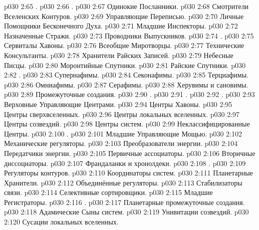 \vs p030 2:65 .
\vs p030 2:66 .
\vs p030 2:67 Одинокие Посланники.
\vs p030 2:68 Смотрители Вселенских Контуров.
\vs p030 2:69 Управляющие Переписью.
\vs p030 2:70 Личные Помощники Бесконечного Духа.
\vs p030 2:71 Младшие Инспекторы.
\vs p030 2:72 Назначенные Стражи.
\vs p030 2:73 Проводники Выпускников.
\vs p030 2:74 .
\vs p030 2:75 Сервиталы Хавоны.
\vs p030 2:76 Всеобщие Миротворцы.
\vs p030 2:77 Технические Консультанты.
\vs p030 2:78 Хранители Райских Записей.
\vs p030 2:79 Небесные Писцы.
\vs p030 2:80 Моронтийные Спутники.
\vs p030 2:81 Райские Спутники.
\vs p030 2:82 .
\vs p030 2:83 Супернафимы.
\vs p030 2:84 Секонафимы.
\vs p030 2:85 Терциафимы.
\vs p030 2:86 Омниафимы.
\vs p030 2:87 Серафимы.
\vs p030 2:88 Херувимы и сановимы.
\vs p030 2:89 Промежуточные создания.
\vs p030 2:90 .
\vs p030 2:91 .
\vs p030 2:92 .
\vs p030 2:93 Верховные Управляющие Центрами.
\vs p030 2:94 Центры Хавоны.
\vs p030 2:95 Центры сверхвселенных.
\vs p030 2:96 Центры локальных вселенных.
\vs p030 2:97 Центры созвездий.
\vs p030 2:98 Центры систем.
\vs p030 2:99 Неклассифицированные Центры.
\vs p030 2:100 .
\vs p030 2:101 Младшие Управляющие Мощью.
\vs p030 2:102 Механические регуляторы.
\vs p030 2:103 Преобразователи энергии.
\vs p030 2:104 Передатчики энергии.
\vs p030 2:105 Первичные ассоциаторы.
\vs p030 2:106 Вторичные диссоциаторы.
\vs p030 2:107 Франдаланки и хронолдеки.
\vs p030 2:108 .
\vs p030 2:109 Регуляторы контуров.
\vs p030 2:110 Координаторы систем.
\vs p030 2:111 Планетарные Хранители.
\vs p030 2:112 Объединённые регуляторы.
\vs p030 2:113 Стабилизаторы связи.
\vs p030 2:114 Селективные сортировщики.
\vs p030 2:115 Младшие Регистраторы.
\vs p030 2:116 .
\vs p030 2:117 Планетарные промежуточные создания.
\vs p030 2:118 Адамические Сыны систем.
\vs p030 2:119 Унивитации созвездий.
\vs p030 2:120 Сусации локальных вселенных.
